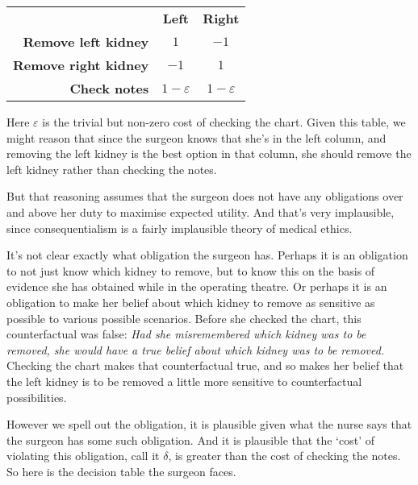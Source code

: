 \documentclass[oneside]{book}
\begin{document}
\begin{center}
\begin{tabular}{r c c}
 & \textbf{Left} & \textbf{Right} \\
\textbf{Remove left kidney} & $1$ & $-1$ \\
\textbf{Remove right kidney} & $-1$ & $1$ \\
\textbf{Check notes} & $1-\varepsilon$ & $1-\varepsilon$ \\
\end{tabular}
\end{center}

\noindent Here $\varepsilon$ is the trivial but non-zero cost of checking the chart. Given this table, we might reason that since the surgeon knows that she's in the left column, and removing the left kidney is the best option in that column, she should remove the left kidney rather than checking the notes.

But that reasoning assumes that the surgeon does not have any obligations over and above her duty to maximise expected utility. And that's very implausible, since consequentialism is a fairly implausible theory of medical ethics.

It's not clear exactly what obligation the surgeon has. Perhaps it is an obligation to not just know which kidney to remove, but to know this on the basis of evidence she has obtained while in the operating theatre. Or perhaps it is an obligation to make her belief about which kidney to remove as sensitive as possible to various possible scenarios. Before she checked the chart, this counterfactual was false: \textit{Had she misremembered which kidney was to be removed, she would have a true belief about which kidney was to be removed.} Checking the chart makes that counterfactual true, and so makes her belief that the left kidney is to be removed a little more sensitive to counterfactual possibilities. 

However we spell out the obligation, it is plausible given what the nurse says that the surgeon has some such obligation. And it is plausible that the `cost' of violating this obligation, call it $\delta$, is greater than the cost of checking the notes. So here is the decision table the surgeon faces.
\end{document}
